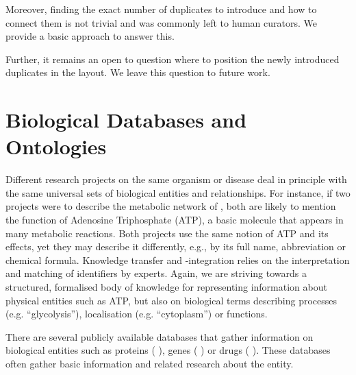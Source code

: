 \documentclass[
	fontsize=10pt, %
	twoside=false, %
	secnumdepth=1, %
]{kaobook}
\begin{document}
Moreover, finding the exact number of duplicates to introduce and how to connect
them is not trivial and was commonly left to human curators. We provide a basic
approach to answer this.

Further, it remains an open to question where to position the newly introduced
duplicates in the layout. We leave this question to future work.



\section{Biological Databases and Ontologies}
\label{sec:ontologies}



Different research projects on the same organism or disease deal in principle
with the same universal sets of biological entities and relationships. For
instance, if two projects were to describe the metabolic network of \ecoli, both
are likely to mention the function of Adenosine Triphosphate (ATP), a basic
molecule that appears in many metabolic reactions. Both projects use the same
notion of ATP and its effects, yet they may describe it differently, e.g., by
its full name, abbreviation or
chemical formula. Knowledge transfer and -integration relies on the
interpretation and matching of identifiers by experts. Again, we are striving
towards a structured, formalised body of knowledge for representing information
about physical entities such as ATP, but also on biological terms describing
processes (e.g. ``glycolysis''), localisation (e.g. ``cytoplasm'') or functions.

There are several publicly available databases that gather information on
biological entities such as proteins (
\cite{theuniprotconsortium_UniProtUniversalProtein_2021}), genes
( \cite{maglott_EntrezGeneGenecentered_2005}) or drugs
( \cite{wishart_DrugBankKnowledgebaseDrugs_2008}). These
databases often gather basic information and related research about the entity.
\end{document}
